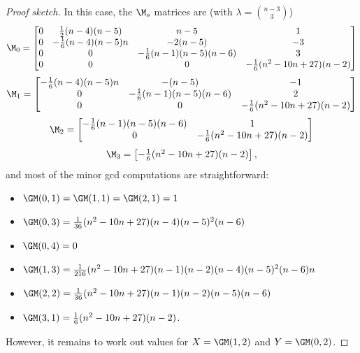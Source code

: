 \begin{proof}[{\it Proof sketch}]
In this case, the $\M_s$ matrices are (with $\lambda = \binom{n-3}{3}$)
\[ \M_0 = \begin{bmatrix} 0 & \frac{1}{2}(n-4)(n-5) & n-5 & 1 \\ 0 & -\frac{1}{6}(n-4)(n-5)n & -2(n-5) & -3 \\ 0 & 0 & -\frac{1}{6}(n-1)(n-5)(n-6) & 3 \\ 0 & 0 & 0 & -\frac{1}{6}(n^2 - 10n + 27)(n-2) \end{bmatrix}  \]
\[ \M_1 = \begin{bmatrix} -\frac{1}{6}(n-4)(n-5)n & -(n-5) & -1 \\ 0 & -\frac{1}{6}(n-1)(n-5)(n-6) & 2 \\ 0 & 0 & -\frac{1}{6}(n^2 - 10n + 27)(n-2) \end{bmatrix}  \]
\[ \M_2 = \begin{bmatrix} -\frac{1}{6}(n-1)(n-5)(n-6) & 1 \\ 0 & -\frac{1}{6}(n^2 - 10n + 27)(n-2) \end{bmatrix}  \]
\[ \M_3 = \begin{bmatrix} -\frac{1}{6}(n^2 - 10n + 27)(n-2) \end{bmatrix}, \]
and most of the minor gcd computations are straightforward:
\begin{itemize} 
    \item $\GM(0,1) = \GM(1,1) = \GM(2,1) = 1$
    \item $\GM(0,3) = \frac{1}{36}(n^2 - 10n + 27)(n - 4)(n - 5)^2(n - 6)$
    \item $\GM(0,4) = 0$
    \item $\GM(1,3) = \frac{1}{216}(n^2 - 10n + 27)(n - 1)(n - 2)(n - 4)(n - 5)^2 (n - 6)n$
    \item $\GM(2,2) = \frac{1}{36}(n^2 - 10n + 27)(n - 1)(n - 2)(n - 5)(n - 6)$
    \item $\GM(3,1) = \frac{1}{6}(n^2 - 10n + 27)(n-2)$.
\end{itemize}
However, it remains to work out values for $X = \GM(1,2)$ and $Y = \GM(0,2)$.


\end{proof}
